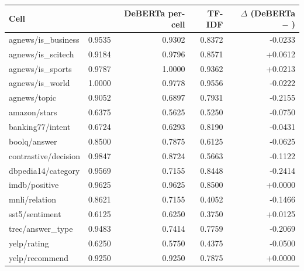 \begin{widetable}
\centering
\footnotesize
\caption{Per-cell accuracy on the 1{,}176 test bundles: \vsix{}, the same-backbone per-cell
classifier (seed 21, six epochs, the converged control) and the supervised TF-IDF reference. The
last column is the classifier minus \vsix{}.}
\label{tab:percell_baselines}
\begin{tabular}{lrrrr}
\toprule
Cell & \vsix{} & DeBERTa per-cell & TF-IDF & $\Delta$ (DeBERTa $-$ \vsix{}) \\
\midrule
agnews/is\_business & 0.9535 & 0.9302 & 0.8372 & -0.0233 \\
agnews/is\_scitech & 0.9184 & 0.9796 & 0.8571 & +0.0612 \\
agnews/is\_sports & 0.9787 & 1.0000 & 0.9362 & +0.0213 \\
agnews/is\_world & 1.0000 & 0.9778 & 0.9556 & -0.0222 \\
agnews/topic & 0.9052 & 0.6897 & 0.7931 & -0.2155 \\
amazon/stars & 0.6375 & 0.5625 & 0.5250 & -0.0750 \\
banking77/intent & 0.6724 & 0.6293 & 0.8190 & -0.0431 \\
boolq/answer & 0.8500 & 0.7875 & 0.6125 & -0.0625 \\
contrastive/decision & 0.9847 & 0.8724 & 0.5663 & -0.1122 \\
dbpedia14/category & 0.9569 & 0.7155 & 0.8448 & -0.2414 \\
imdb/positive & 0.9625 & 0.9625 & 0.8500 & +0.0000 \\
mnli/relation & 0.8621 & 0.7155 & 0.4052 & -0.1466 \\
sst5/sentiment & 0.6125 & 0.6250 & 0.3750 & +0.0125 \\
trec/answer\_type & 0.9483 & 0.7414 & 0.7759 & -0.2069 \\
yelp/rating & 0.6250 & 0.5750 & 0.4375 & -0.0500 \\
yelp/recommend & 0.9250 & 0.9250 & 0.7875 & +0.0000 \\
\bottomrule
\end{tabular}
\end{widetable}
